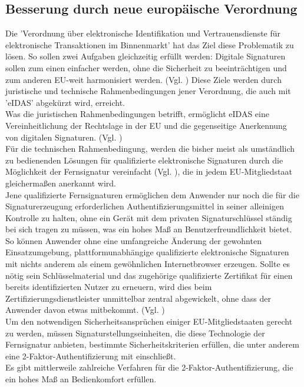 \documentclass[deutsch]{lib/llncs/llncs}
\begin{document}
\subsection{Besserung durch neue europäische Verordnung}
Die 'Verordnung über elektronische Identifikation und Vertrauensdienste für elektronische Transaktionen im Binnenmarkt' hat das Ziel diese Problematik zu lösen. So sollen zwei Aufgaben gleichzeitig erfüllt werden: Digitale Signaturen sollen zum einen einfacher werden, ohne die Sicherheit zu beeinträchtigen und zum anderen EU-weit harmonisiert werden. (Vgl. \cite[S. 33]{schmeh2017neue}) Diese Ziele werden durch juristische und technische Rahmenbedingungen jener Verordnung, die auch mit 'eIDAS' abgekürzt wird, erreicht. \\
Was die juristischen Rahmenbedingungen betrifft, ermöglicht eIDAS eine Vereinheitlichung der Rechtslage in der EU und die gegenseitige Anerkennung von digitalen Signaturen. (Vgl. \cite[S. 33]{schmeh2017neue}) \\
Für die technischen Rahmenbedingung, werden die bisher meist als umständlich zu bedienenden Lösungen für qualifizierte elektronische Signaturen durch die Möglichkeit der Fernsignatur vereinfacht (Vgl. \cite[S. 30]{schmeh2017neue}), die in jedem EU-Mitgliedstaat gleichermaßen anerkannt wird. \\
Jene qualifizierte Fernsignaturen ermöglichen dem Anwender nur noch die für die Signaturerzeugung erforderlichen Authentifizierungsmittel in seiner alleinigen Kontrolle zu halten, ohne ein Gerät mit dem privaten Signaturschlüssel ständig bei sich tragen zu müssen, was ein hohes Maß an Benutzerfreundlichkeit bietet. So können Anwender ohne eine umfangreiche Änderung der gewohnten Einsatzumgebung, plattformunabhängige qualifizierte elektronische Signaturen mit nichts anderem als einem gewöhnlichen Internetbrowser erzeugen.  Sollte es nötig sein Schlüsselmaterial und das zugehörige qualifizierte Zertifikat für einen bereits identifizierten Nutzer zu erneuern, wird dies beim Zertifizierungsdienstleister unmittelbar zentral abgewickelt, ohne dass der Anwender davon etwas mitbekommt. (Vgl. \cite[S. 233-234]{entschew2016neue})\\
Um den notwendigen Sicherheitsansprüchen einiger EU-Mitgliedstaaten gerecht zu werden, müssen Signaturstellungseinheiten, die diese Technologie der Fernsignatur anbieten, bestimmte Sicherheitskriterien erfüllen, die unter anderem eine 2-Faktor-Authentifizierung mit einschließt. \\
Es gibt mittlerweile zahlreiche Verfahren für die 2-Faktor-Authentifizierung, die ein hohes Maß an Bedienkomfort erfüllen. \\
\end{document}
